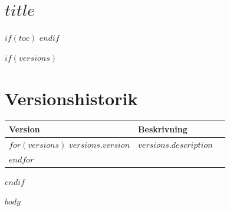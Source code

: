 \documentclass[12pt,a4paper]{article}
\begin{document}
\section*{$title$}

$if(toc)$
\tableofcontents
$endif$

$if(versions)$
\section{Versionshistorik}
\begin{longtable}[]{@{}lll@{}}
\toprule
Version & Beskrivning\tabularnewline%
\midrule
\endhead%
$for(versions)$
$versions.version$ & $versions.description$\tabularnewline%
$endfor$
\bottomrule
\end{longtable}
$endif$

$body$
\end{document}
